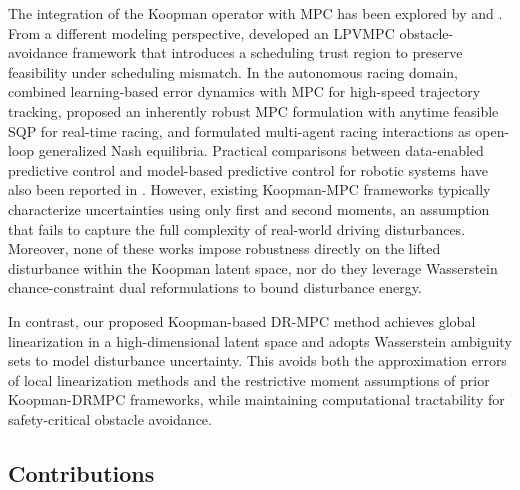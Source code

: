 \documentclass[pdflatex,sn-mathphys,Numbered]{sn-jnl}
\numberwithin{equation}{section}
\begin{document}
	The integration of the Koopman operator with MPC has been explored by \citet{zhang2021} and \citet{zhang2022}. From a different modeling perspective, \citet{nezami2024} developed an LPVMPC obstacle-avoidance framework that introduces a scheduling trust region to preserve feasibility under scheduling mismatch. In the autonomous racing domain, \citet{xue2024} combined learning-based error dynamics with MPC for high-speed trajectory tracking, \citet{numerow2024} proposed an inherently robust MPC formulation with anytime feasible SQP for real-time racing, and \citet{zhu2024} formulated multi-agent racing interactions as open-loop generalized Nash equilibria. Practical comparisons between data-enabled predictive control and model-based predictive control for robotic systems have also been reported in \citet{chenjirs2026}. However, existing Koopman-MPC frameworks typically characterize uncertainties using only first and second moments, an assumption that fails to capture the full complexity of real-world driving disturbances. Moreover, none of these works impose robustness directly on the lifted disturbance within the Koopman latent space, nor do they leverage Wasserstein chance-constraint dual reformulations to bound disturbance energy.
	
	In contrast, our proposed Koopman-based DR-MPC method achieves global linearization in a high-dimensional latent space and adopts Wasserstein ambiguity sets to model disturbance uncertainty. This avoids both the approximation errors of local linearization methods and the restrictive moment assumptions of prior Koopman-DRMPC frameworks, while maintaining computational tractability for safety-critical obstacle avoidance.
	
	\subsection{Contributions}
	\label{subsec3}
	
\end{document}
